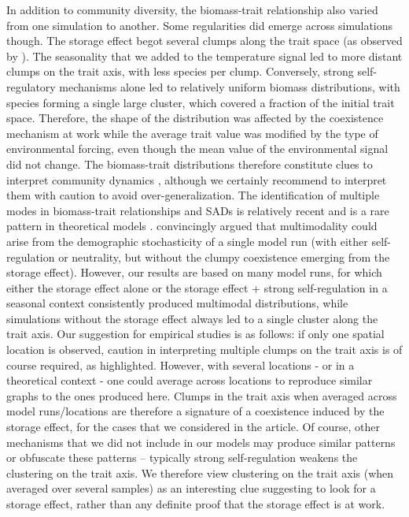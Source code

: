 \documentclass[a4paper,12pt]{article}
\begin{document}
In addition to community diversity, the biomass-trait relationship
also varied from one simulation to another. Some regularities did
emerge across simulations though. The storage effect begot several
clumps along the trait space (as observed by \citealp{scranton_coexistence_2016}).
The seasonality that we added to the temperature signal led to more
distant clumps on the trait axis, with less species per clump. Conversely,
strong self-regulatory mechanisms alone led to relatively uniform
biomass distributions, with species forming a single large cluster,
which covered a fraction of the initial trait space. Therefore, the
shape of the distribution was affected by the coexistence mechanism
at work while the average trait value was modified by the type of
environmental forcing, even though the mean value of the environmental
signal did not change. The biomass-trait distributions therefore constitute
clues to interpret community dynamics \citep{dandrea_challenges_2016,loranger_what_2018},
although we certainly recommend to interpret them with caution to
avoid over-generalization. The identification of multiple modes in
biomass-trait relationships and SADs is relatively recent \citep{dornelas_multiple_2008,matthews_multimodal_2014}
and is a rare pattern in theoretical models \citep{mcgill_species_2007}.
\citet{barabas_emergent_2013} convincingly argued that multimodality
could arise from the demographic stochasticity of a single model run
(with either self-regulation or neutrality, but without the clumpy
coexistence emerging from the storage effect). However, our results
are based on many model runs, for which either the storage effect
alone or the storage effect + strong self-regulation in a seasonal context
consistently produced multimodal distributions, while simulations
without the storage effect always led to a single cluster along the
trait axis. Our suggestion for empirical studies is as follows: if
only one spatial location is observed, caution in interpreting multiple
clumps on the trait axis is of course required, as \citet{barabas_emergent_2013}
highlighted. However, with several locations - or in a theoretical
context - one could average across locations to reproduce similar
graphs to the ones produced here. Clumps in the trait axis when averaged
across model runs/locations are therefore a signature of a coexistence
induced by the storage effect, for the cases that we considered in
the article. Of course, other mechanisms that we did not include in
our models may produce similar patterns \citep{rael2018emergent}
or obfuscate these patterns -- typically strong self-regulation weakens
the clustering on the trait axis. We therefore view clustering on
the trait axis (when averaged over several samples) as an interesting
clue suggesting to look for a storage effect, rather than any definite
proof that the storage effect is at work. 
\end{document}
